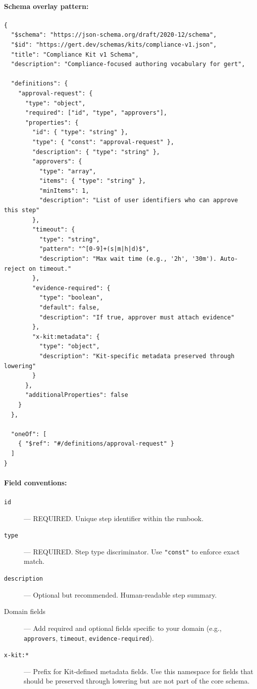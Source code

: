 \paragraph{Schema overlay pattern:}

\begin{verbatim}
{
  "$schema": "https://json-schema.org/draft/2020-12/schema",
  "$id": "https://gert.dev/schemas/kits/compliance-v1.json",
  "title": "Compliance Kit v1 Schema",
  "description": "Compliance-focused authoring vocabulary for gert",

  "definitions": {
    "approval-request": {
      "type": "object",
      "required": ["id", "type", "approvers"],
      "properties": {
        "id": { "type": "string" },
        "type": { "const": "approval-request" },
        "description": { "type": "string" },
        "approvers": {
          "type": "array",
          "items": { "type": "string" },
          "minItems": 1,
          "description": "List of user identifiers who can approve this step"
        },
        "timeout": {
          "type": "string",
          "pattern": "^[0-9]+(s|m|h|d)$",
          "description": "Max wait time (e.g., '2h', '30m'). Auto-reject on timeout."
        },
        "evidence-required": {
          "type": "boolean",
          "default": false,
          "description": "If true, approver must attach evidence"
        },
        "x-kit:metadata": {
          "type": "object",
          "description": "Kit-specific metadata preserved through lowering"
        }
      },
      "additionalProperties": false
    }
  },

  "oneOf": [
    { "$ref": "#/definitions/approval-request" }
  ]
}
\end{verbatim}

\paragraph{Field conventions:}

\begin{description}
  \item[\texttt{id}] --- REQUIRED. Unique step identifier within the runbook.
  \item[\texttt{type}] --- REQUIRED. Step type discriminator. Use \texttt{"const"}
    to enforce exact match.
  \item[\texttt{description}] --- Optional but recommended. Human-readable step
    summary.
  \item[Domain fields] --- Add required and optional fields specific to your
    domain (e.g., \texttt{approvers}, \texttt{timeout}, \texttt{evidence-required}).
  \item[\texttt{x-kit:*}] --- Prefix for Kit-defined metadata fields. Use this
    namespace for fields that should be preserved through lowering but are not
    part of the core schema.
\end{description}


